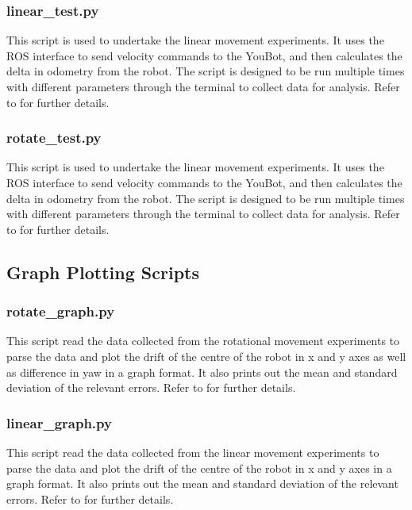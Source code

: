 \documentclass[a4paper, 12pt]{article}
\newif\ifshownotes
\newcommand{\notes}[1]{\ifshownotes\textcolor{blue}{#1}\fi}
\begin{document}
    \subsubsection{linear\_test.py}
    This script is used to undertake the linear movement experiments. It uses the ROS interface to send velocity commands to the YouBot, and then calculates the delta in odometry from the robot. The script is designed to be run multiple times with different parameters through the terminal to collect data for analysis. Refer to \notes{insert something here idr} for further details.
    
    \pagebreak
    \subsubsection{rotate\_test.py}
    This script is used to undertake the linear movement experiments. It uses the ROS interface to send velocity commands to the YouBot, and then calculates the delta in odometry from the robot. The script is designed to be run multiple times with different parameters through the terminal to collect data for analysis. Refer to \notes{insert something here idr} for further details.
    
    \pagebreak
    \subsection{Graph Plotting Scripts}
    \label{appendix:graph_scripts}
    \subsubsection{rotate\_graph.py}
    This script read the data collected from the rotational movement experiments to parse the data and plot the drift of the centre of the robot in x and y axes as well as difference in yaw in a graph format. It also prints out the mean and standard deviation of the relevant errors. Refer to \notes{insert something here idr} for further details. 
    
    \pagebreak
    \subsubsection{linear\_graph.py}
    This script read the data collected from the linear movement experiments to parse the data and plot the drift of the centre of the robot in x and y axes in a graph format. It also prints out the mean and standard deviation of the relevant errors. Refer to \notes{insert something here idr} for further details. 
    
    \pagebreak
\end{document}
